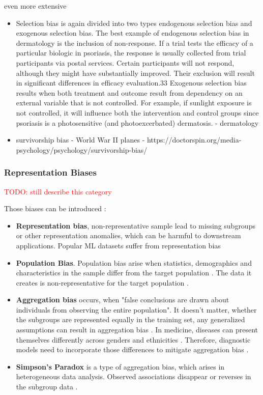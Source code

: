 \documentclass[12pt, a4paper, oneside]{book}   	%
\renewcommand{\todo}[1]{\textcolor{red}{TODO: #1}}
\renewcommand{\paragraph}[1]{%
	\subsubsection*{#1}%
}
\newif\ifrawcitationactive
\newcommand{\rawcitationend}{
	\color{black}\rawcitationactivefalse
}
\begin{document}
				even more extensive
				\begin{itemize}
					\item Selection bias is again divided into two types endogenous selection bias and exogenous selection bias. The best example of endogenous selection bias in dermatology is the inclusion of non-response. If a trial tests the efficacy of a particular biologic in psoriasis, the response is usually collected from trial participants via postal services. Certain participants will not respond, although they might have substantially improved. Their exclusion will result in significant differences in efficacy evaluation.33
					Exogenous selection bias results when both treatment and outcome result from dependency on an external variable that is not controlled. For example, if sunlight exposure is not controlled, it will influence both the intervention and control groups since psoriasis is a photosensitive (and photoexcerbated) dermatosis. \autocite{Chakraborty_2024} - dermatology
					
					
					\item survivorship bias - World War II planes \autocite{Silfwer_2017} - https://doctorspin.org/media-psychology/psychology/survivorship-bias/
				\end{itemize}
					
				\rawcitationend
					
				\paragraph{Representation Biases}
				\todo{still describe this category} 
				
				Those biases can be introduced :
				\begin{itemize}
					\item \textbf{Representation bias}, non-representative sample lead to missing subgroups or other representation anomalies, which can be harmful to downstream applications. Popular ML datasets suffer from representation bias \autocites{Mehrabi_2021}{M142_Shankar_2017}
					\item \textbf{Population Bias}. Population bias arise when statistics, demographics and characteristics in the sample differ from the target population \autocite{M120_Olteanu_2019}. The data it creates is non-representative for the target population \autocite{Mehrabi_2021}.
					\item \textbf{Aggregation bias} occurs, when "false conclusions are drawn about individuals from observing the entire population". It doesn't matter, whether the subgroups are represented equally in the training set, any generalized assumptions can result in aggregation bias \autocite{Mehrabi_2021}. In medicine, diseases can present themselves differently across genders and ethnicities \autocite{M144_Suresh_2021}. Therefore, diagnostic models need to incorporate those differences to mitigate aggregation bias \autocite{Mehrabi_2021}.
					\item \textbf{Simpson's Paradox} is a type of aggregation bias, which arises in heterogeneous data analysis. Observed associations disappear or reverses in the subgroup data \autocite{Mehrabi_2021}.
				\end{itemize}
				
\end{document}
